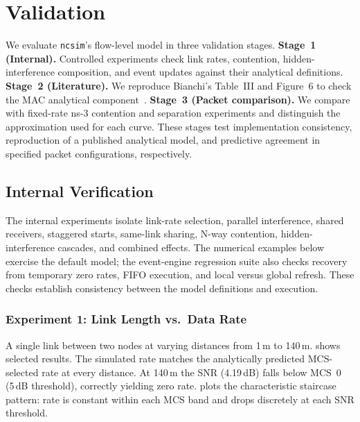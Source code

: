 \documentclass[conference]{IEEEtran}
\newcommand{\ncsim}{\texttt{ncsim}}
\begin{document}
\section{Validation}
\label{sec:validation}

We evaluate \ncsim{}'s flow-level model in three validation stages.
\textbf{Stage~1 (Internal).} Controlled experiments check link rates,
contention, hidden-interference composition, and event updates against
their analytical definitions.
\textbf{Stage~2 (Literature).} We reproduce Bianchi's Table~III and
Figure~6 to check the MAC analytical component~\cite{bianchi2000}.
\textbf{Stage~3 (Packet comparison).} We compare with fixed-rate
ns-3 contention and separation experiments and distinguish the approximation
used for each curve. These stages test implementation consistency,
reproduction of a published analytical model, and predictive agreement
in specified packet configurations, respectively.

\subsection{Internal Verification}
\label{sec:internal_val}

The internal experiments isolate link-rate selection, parallel
interference, shared receivers, staggered starts, same-link sharing,
N-way contention, hidden-interference cascades, and combined effects.
The numerical examples below exercise the default
model; the event-engine regression suite also checks recovery
from temporary zero rates, FIFO execution, and local versus global refresh.
These checks establish consistency between the model definitions and execution.

\subsubsection{Experiment 1: Link Length vs.\ Data Rate}

A single link between two nodes at varying distances from 1\,m to 140\,m.
 shows selected results.  The simulated rate matches the
analytically predicted MCS-selected rate at every distance.  At 140\,m the
SNR (4.19\,dB) falls below MCS~0 (5\,dB threshold), correctly yielding zero
rate.   plots the characteristic staircase pattern: rate
is constant within each MCS band and drops discretely at each SNR threshold.
\end{document}
